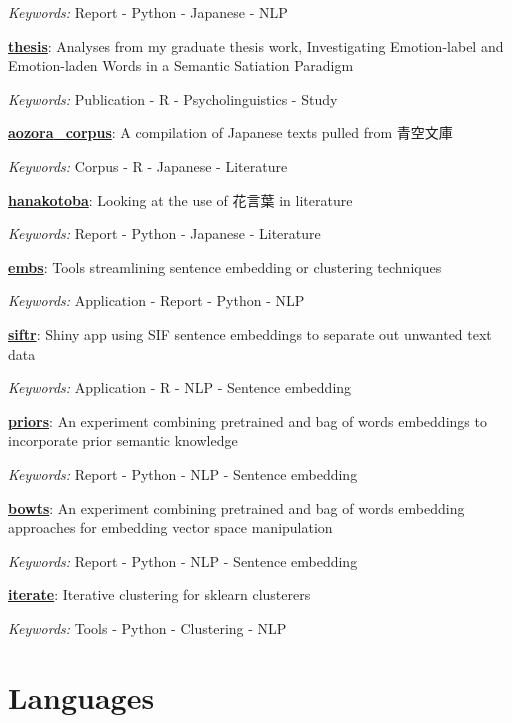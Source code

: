 \documentclass[a4paper,9pt]{extarticle}
\begin{document}
\textit{Keywords:} Report - Python - Japanese - NLP

\noindent\textbf{\href{https://github.com/ryancahildebrandt/thesis}{thesis}}: Analyses from my graduate thesis work, Investigating Emotion-label and Emotion-laden Words in a Semantic Satiation Paradigm

\textit{Keywords:} Publication - R - Psycholinguistics - Study

\noindent\textbf{\href{https://github.com/ryancahildebrandt/aozora_corpus}{aozora{\_}corpus}}: A compilation of Japanese texts pulled from 青空文庫

\textit{Keywords:} Corpus - R - Japanese - Literature

\noindent\textbf{\href{https://github.com/ryancahildebrandt/hanakotoba}{hanakotoba}}: Looking at the use of 花言葉 in literature 

\textit{Keywords:} Report - Python - Japanese - Literature

\noindent\textbf{\href{https://github.com/ryancahildebrandt/embs}{embs}}: Tools streamlining sentence embedding or clustering techniques

\textit{Keywords:} Application - Report - Python - NLP

\noindent\textbf{\href{https://github.com/ryancahildebrandt/siftr}{siftr}}: Shiny app using SIF sentence embeddings to separate out unwanted text data

\textit{Keywords:} Application - R - NLP - Sentence embedding

\noindent\textbf{\href{https://github.com/ryancahildebrandt/priors}{priors}}: An experiment combining pretrained and bag of words embeddings to incorporate prior semantic knowledge

\textit{Keywords:} Report - Python - NLP - Sentence embedding

\noindent\textbf{\href{https://github.com/ryancahildebrandt/bowts}{bowts}}: An experiment combining pretrained and bag of words embedding approaches for embedding vector space manipulation

\textit{Keywords:} Report - Python - NLP - Sentence embedding

\noindent\textbf{\href{https://github.com/ryancahildebrandt/iterate}{iterate}}: Iterative clustering for sklearn clusterers

\textit{Keywords:} Tools - Python - Clustering - NLP

\section*{Languages}
\end{document}
